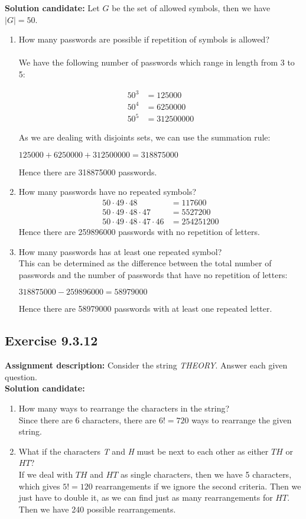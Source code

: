 \documentclass{report}
\newcommand{\cent}[1]{\begin{center}#1\end{center}}
\newcommand{\mAlign}[1]{\begin{align*}#1\end{align*}}
\newcommand{\assignmentDescription}{\textbf{Assignment description: }}
\newcommand{\solution}{\textbf{Solution candidate: }}
\newcommand{\Exercise}[1]{\subsection{Exercise #1}}
\newcommand{\defaultEnumerateLabel}{\textbf{\alph*.}}
\newcommand{\myItem}[1]{\item #1\\}
\newcommand{\letterEnumeration}[1]{\begin{enumerate}[label = \defaultEnumerateLabel]
		#1
\end{enumerate}}
\begin{document}
 	\solution
 	Let $G$ be the set of allowed symbols, then we have $|G| =  50$.
 	\letterEnumeration{
 		\myItem{How many passwords are possible if repetition of symbols is allowed?\\}
 		
 		We have the following number of passwords which range in length from 3 to 5:
 		
 		\mAlign{
 			50^3 &= 125000 \\
 			50^4 &= 6250000\\
 			50^5 &= 312500000
 		}
 		
 		As we are dealing with disjoints sets, we can use the summation rule:
 		
 		\cent{$125000 + 6250000 + 312500000 = 318875000 $}
 		
 		Hence there are 318875000 passwords.\\
 		
 		\myItem{How many passwords have no repeated symbols?}
 		
 		\mAlign{
 			50 \cdot 49 \cdot 48 &= 117600 \\
 			50 \cdot 49 \cdot 48 \cdot 47 &= 5527200\\
 			50 \cdot 49 \cdot 48 \cdot 47 \cdot 46 & = 254251200
 		}
 	Hence there are 259896000 passwords with no repetition of letters.\\
 	
 	\myItem{How many passwords has at least one repeated symbol?}
 	
 	This can be determined as the difference between the total number of passwords and the number of passwords that have no repetition of letters:
 	
 	\cent{$318875000 - 259896000 = 58979000$}
 	
 	Hence there are 58979000 passwords with at least one repeated letter.\\
 	}
 		
 	\Exercise{9.3.12}
 	\assignmentDescription
 	Consider the string \textit{THEORY}. Answer each given question.\\
 	\solution
 	
 	\letterEnumeration{
 		\myItem{How many ways to rearrange the characters in the string?}
 		
 		Since there are 6 characters, there are $6! = 720$ ways to rearrange the given string.\\
 		
 		\myItem{What if the characters \textit{T} and \textit{H} must be next to each other as either $TH$ or $HT$?}
 		
 		If we deal with $TH$ and $HT$ as single characters, then we have 5 characters, which gives $5! = 120 $ rearrangements if we ignore the second criteria. Then we just have to double it, as we can find just as many rearrangements for $HT$. Then we have 240 possible rearrangements.\\
 		
 	}
 	
\end{document}
